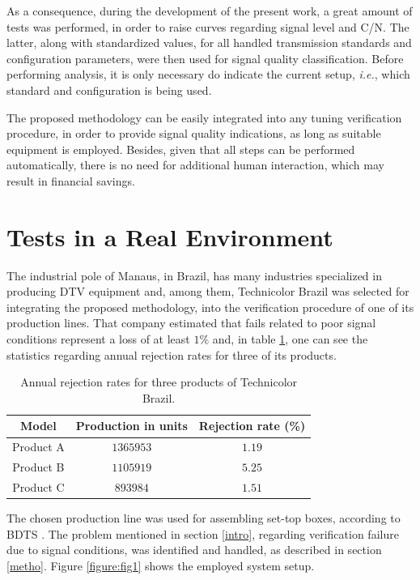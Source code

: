 \documentclass[conference]{IEEEtran}
\begin{document}
As a consequence, during the development of the present work, a great amount of tests was performed, in order to raise curves regarding signal level and C/N. The latter, along with standardized values, for all handled transmission standards and configuration parameters, were then used for signal quality classification. Before performing analysis, it is only necessary do indicate the current setup, {\it i.e.}, which standard and configuration is being used.

The proposed methodology can be easily integrated into any tuning verification procedure, in order to provide signal quality indications, as long as suitable equipment is employed. Besides, given that all steps can be performed automatically, there is no need for additional human interaction, which may result in financial savings.

\section{Tests in a Real Environment}

The industrial pole of Manaus, in Brazil, has many industries specialized in producing DTV equipment and, among them, Technicolor Brazil was selected for integrating the proposed methodology, into the verification procedure of one of its production lines. That company estimated that fails related to poor signal conditions represent a loss of at least $1\%$ and, in table \ref{table:tab1}, one can see the statistics regarding annual rejection rates for three of its products.

\begin{table}[!htb]
\centering
\caption{Annual rejection rates for three products of Technicolor Brazil.}\label{table:tab1}
\begin{tabular}{|c c c|}
\hline
  		Model	& Production in units	& Rejection rate (\%)\\
\hline
Product A & $1365953$	& $1.19$\\
Product B & $1105919$	& $5.25$\\
Product C & $893984$	& $1.51$\\
\hline
\end{tabular}
\end{table}

The chosen production line was used for assembling set-top boxes, according to BDTS \cite{sbtvd}. The problem mentioned in section \ref{intro}, regarding verification failure due to signal conditions, was identified and handled, as described in section \ref{metho}. Figure \ref{figure:fig1} shows the employed system setup.
\end{document}
